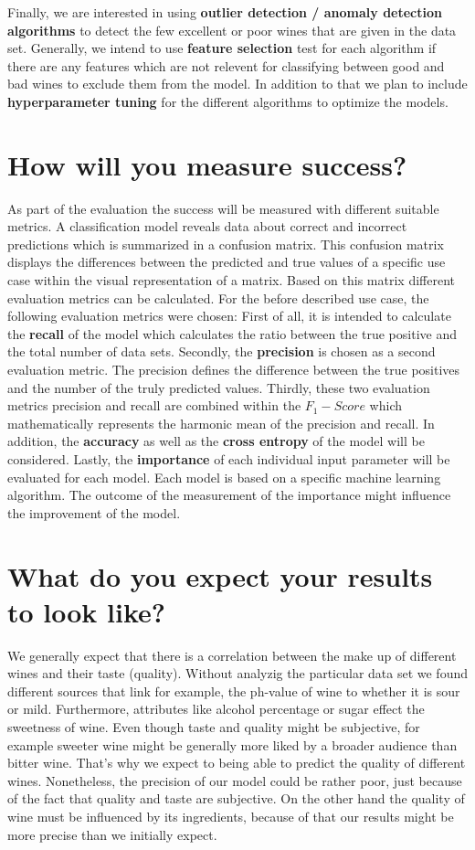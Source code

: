 \documentclass[11pt,titlepage,oneside,openany]{article}
\begin{document}
Finally, we are interested in using \textbf{outlier detection / anomaly detection algorithms} to detect the few 
excellent or poor wines that are given in the data set.
Generally, we intend to use \textbf{feature selection} test for each algorithm if there are any features which are not relevent 
for classifying between good and bad wines to exclude them from the model. In addition to that we plan to include
\textbf{hyperparameter tuning} for the different algorithms to optimize the models.

\section{How will you measure success?}
As part of the evaluation the success will be measured with different suitable metrics. A classification model reveals data about correct and incorrect predictions which is summarized in a confusion matrix. This confusion matrix displays the differences between the predicted and true values of a specific use case within the visual representation of a matrix. Based on this matrix different evaluation metrics can be calculated. For the before described use case, the following evaluation metrics were chosen:
First of all, it is intended to calculate the \textbf{recall} of the model which calculates the ratio between the true positive and the total number of data sets. Secondly, the \textbf{precision} is chosen as a second evaluation metric. The precision defines the difference between the true positives and the number of the truly predicted values. Thirdly, these two evaluation metrics precision and recall are combined within the \textbf{$F_1-Score$} which mathematically represents the harmonic mean of the precision and recall. In addition, the \textbf{accuracy} as well as the \textbf{cross entropy} of the model will be considered. Lastly, the \textbf{importance} of each individual input parameter will be evaluated for each model. Each model is based on a specific machine learning algorithm. The outcome of the measurement of the importance might influence the improvement of the model.


\section{What do you expect your results to look like?}
We generally expect that there is a correlation between the make up of different wines and their taste (quality). Without analyzig the particular data set we found different sources that link for example, the ph-value of wine to whether it is sour or mild. Furthermore, attributes like alcohol percentage or sugar effect the sweetness of wine. Even though taste and quality might be subjective, for example sweeter wine might be generally more liked by a broader audience than bitter wine. That's why we expect to being able to predict the quality of different wines. Nonetheless, the precision of our model could be rather poor, just because of the fact that quality and taste are subjective. On the other hand the quality of wine must be influenced by its ingredients, because of that our results might be more precise than we initially expect.
\end{document}
